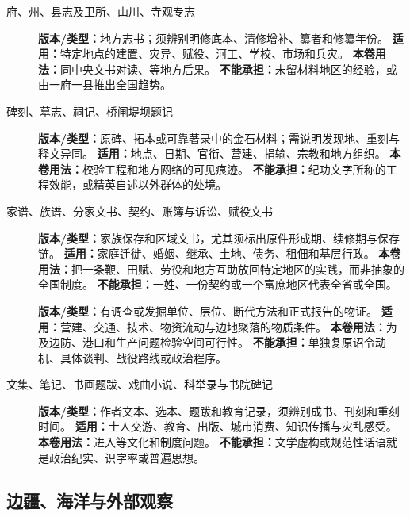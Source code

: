 \begin{description}
  \item[府、州、县志及卫所、山川、寺观专志] \textbf{版本/类型：}地方志书；须辨别明修底本、清修增补、纂者和修纂年份。 \textbf{适用：}特定地点的建置、灾异、赋役、河工、学校、市场和兵灾。 \textbf{本卷用法：}同中央文书对读、等地方后果。 \textbf{不能承担：}未留材料地区的经验，或由一府一县推出全国趋势。
  \item[碑刻、墓志、祠记、桥闸堤坝题记] \textbf{版本/类型：}原碑、拓本或可靠著录中的金石材料；需说明发现地、重刻与释文异同。 \textbf{适用：}地点、日期、官衔、营建、捐输、宗教和地方组织。 \textbf{本卷用法：}校验工程和地方网络的可见痕迹。 \textbf{不能承担：}纪功文字所称的工程效能，或精英自述以外群体的处境。
  \item[家谱、族谱、分家文书、契约、账簿与诉讼、赋役文书] \textbf{版本/类型：}家族保存和区域文书，尤其须标出原件形成期、续修期与保存链。 \textbf{适用：}家庭迁徙、婚姻、继承、土地、债务、租佃和基层行政。 \textbf{本卷用法：}把一条鞭、田赋、劳役和地方互助放回特定地区的实践，而非抽象的全国制度。 \textbf{不能承担：}一姓、一份契约或一个富庶地区代表全省或全国。
  \item[] \textbf{版本/类型：}有调查或发掘单位、层位、断代方法和正式报告的物证。 \textbf{适用：}营建、交通、技术、物资流动与边地聚落的物质条件。 \textbf{本卷用法：}为及边防、港口和生产问题检验空间可行性。 \textbf{不能承担：}单独复原诏令动机、具体谈判、战役路线或政治程序。
  \item[文集、笔记、书画题跋、戏曲小说、科举录与书院碑记] \textbf{版本/类型：}作者文本、选本、题跋和教育记录，须辨别成书、刊刻和重刻时间。 \textbf{适用：}士人交游、教育、出版、城市消费、知识传播与灾乱感受。 \textbf{本卷用法：}进入等文化和制度问题。 \textbf{不能承担：}文学虚构或规范性话语就是政治纪实、识字率或普遍思想。
\end{description}

\subsection{边疆、海洋与外部观察}


